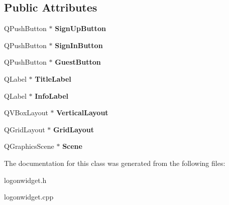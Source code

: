 \subsection*{Public Attributes}
\begin{DoxyCompactItemize}
\item 
\hypertarget{classLogOnWidget_a278b4aef2ed697a807caf122765bba14}{Q\-Push\-Button $\ast$ {\bfseries Sign\-Up\-Button}}\label{classLogOnWidget_a278b4aef2ed697a807caf122765bba14}

\item 
\hypertarget{classLogOnWidget_a03c8de69df4213f5c20ccb85e0bac36a}{Q\-Push\-Button $\ast$ {\bfseries Sign\-In\-Button}}\label{classLogOnWidget_a03c8de69df4213f5c20ccb85e0bac36a}

\item 
\hypertarget{classLogOnWidget_ab102bcf828c0221a21b541c864ea452c}{Q\-Push\-Button $\ast$ {\bfseries Guest\-Button}}\label{classLogOnWidget_ab102bcf828c0221a21b541c864ea452c}

\item 
\hypertarget{classLogOnWidget_acd4a39c90fb3fb618d0bd69a5af7b856}{Q\-Label $\ast$ {\bfseries Title\-Label}}\label{classLogOnWidget_acd4a39c90fb3fb618d0bd69a5af7b856}

\item 
\hypertarget{classLogOnWidget_a91f18d4e66949d4e689195a53f840272}{Q\-Label $\ast$ {\bfseries Info\-Label}}\label{classLogOnWidget_a91f18d4e66949d4e689195a53f840272}

\item 
\hypertarget{classLogOnWidget_a55af2f5d84c099c242635dc057fea89c}{Q\-V\-Box\-Layout $\ast$ {\bfseries Vertical\-Layout}}\label{classLogOnWidget_a55af2f5d84c099c242635dc057fea89c}

\item 
\hypertarget{classLogOnWidget_aa2f97eb976a762dfef72222e70fc9d2f}{Q\-Grid\-Layout $\ast$ {\bfseries Grid\-Layout}}\label{classLogOnWidget_aa2f97eb976a762dfef72222e70fc9d2f}

\item 
\hypertarget{classLogOnWidget_a73d767c2ed43e2327c8200307f73657d}{Q\-Graphics\-Scene $\ast$ {\bfseries Scene}}\label{classLogOnWidget_a73d767c2ed43e2327c8200307f73657d}

\end{DoxyCompactItemize}


The documentation for this class was generated from the following files\-:\begin{DoxyCompactItemize}
\item 
logonwidget.\-h\item 
logonwidget.\-cpp\end{DoxyCompactItemize}
